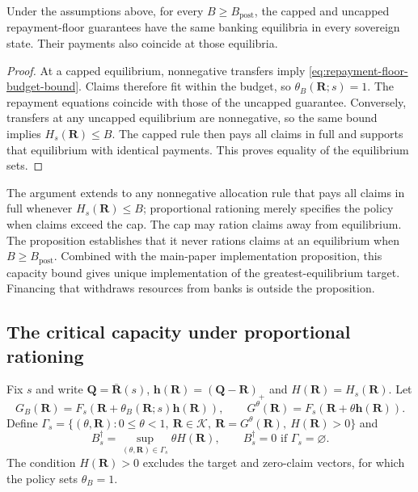 \begin{proposition}\label{prop:floor-budget}
Under the assumptions above, for every $B\geq B_{\mathrm{post}}$, the capped
and uncapped repayment-floor guarantees have the same banking equilibria
in every sovereign state. Their payments also coincide at those equilibria.
\end{proposition}
\begin{proof}
At a capped equilibrium, nonnegative transfers imply
\eqref{eq:repayment-floor-budget-bound}. Claims therefore fit within the
budget, so $\theta_B(\mathbf{R};s)=1$. The repayment equations coincide with those
of the uncapped guarantee. Conversely, transfers at any uncapped equilibrium are
nonnegative, so the same bound implies $H_s(\mathbf{R})\leq B$. The capped rule then
pays all claims in full and supports that equilibrium with identical
payments. This proves equality of the equilibrium sets.
\end{proof}

The argument extends to any nonnegative allocation rule that pays all claims
in full whenever $H_s(\mathbf{R})\leq B$; proportional rationing merely specifies the
policy when claims exceed the cap. The cap may ration claims away from
equilibrium. The proposition establishes that it never rations claims at an
equilibrium when $B\geq B_{\mathrm{post}}$. Combined with the main-paper implementation proposition, this capacity bound gives unique implementation of the greatest-equilibrium target. Financing that withdraws resources from banks is outside the proposition.

\subsection{The critical capacity under proportional rationing}
Fix $s$ and write $\mathbf{Q}=\bar{\mathbf{R}}(s)$, $\mathbf{h}(\mathbf{R})=(\mathbf{Q}-\mathbf{R})_+$ and $H(\mathbf{R})=H_s(\mathbf{R})$. Let
\[
 G_B(\mathbf{R})=F_s(\mathbf{R}+\theta_B(\mathbf{R};s)\mathbf{h}(\mathbf{R})),\qquad
 G^\theta(\mathbf{R})=F_s(\mathbf{R}+\theta \mathbf{h}(\mathbf{R})).
\]
Define $\Gamma_s=\{(\theta,\mathbf{R}):0\leq\theta<1,\ \mathbf{R}\in\mathcal K,\ \mathbf{R}=G^\theta(\mathbf{R}),\ H(\mathbf{R})>0\}$ and
\[
 B_s^\dagger=\sup_{(\theta,\mathbf{R})\in\Gamma_s}\theta H(\mathbf{R}),
 \qquad B_s^\dagger=0\text{ if }\Gamma_s=\varnothing.
\]
The condition $H(\mathbf{R})>0$ excludes the target and zero-claim vectors, for which the policy sets $\theta_B=1$.

